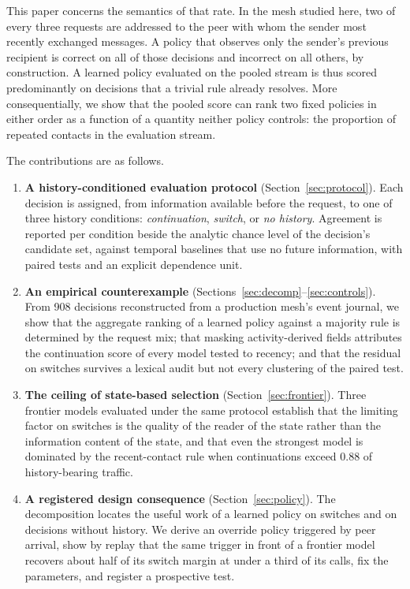 \documentclass[11pt]{article}
\theoremstyle{definition}
\begin{document}
This paper concerns the semantics of that rate. In the mesh studied here, two of every three requests are addressed to the peer with whom the sender most recently exchanged messages. A policy that observes only the sender's previous recipient is correct on all of those decisions and incorrect on all others, by construction. A learned policy evaluated on the pooled stream is thus scored predominantly on decisions that a trivial rule already resolves. More consequentially, we show that the pooled score can rank two fixed policies in either order as a function of a quantity neither policy controls: the proportion of repeated contacts in the evaluation stream.

The contributions are as follows.
\begin{enumerate}
\item \textbf{A history-conditioned evaluation protocol} (Section~\ref{sec:protocol}). Each decision is assigned, from information available before the request, to one of three history conditions: \emph{continuation}, \emph{switch}, or \emph{no history}. Agreement is reported per condition beside the analytic chance level of the decision's candidate set, against temporal baselines that use no future information, with paired tests and an explicit dependence unit.
\item \textbf{An empirical counterexample} (Sections~\ref{sec:decomp}--\ref{sec:controls}). From 908 decisions reconstructed from a production mesh's event journal, we show that the aggregate ranking of a learned policy against a majority rule is determined by the request mix; that masking activity-derived fields attributes the continuation score of every model tested to recency; and that the residual on switches survives a lexical audit but not every clustering of the paired test.
\item \textbf{The ceiling of state-based selection} (Section~\ref{sec:frontier}). Three frontier models evaluated under the same protocol establish that the limiting factor on switches is the quality of the reader of the state rather than the information content of the state, and that even the strongest model is dominated by the recent-contact rule when continuations exceed 0.88 of history-bearing traffic.
\item \textbf{A registered design consequence} (Section~\ref{sec:policy}). The decomposition locates the useful work of a learned policy on switches and on decisions without history. We derive an override policy triggered by peer arrival, show by replay that the same trigger in front of a frontier model recovers about half of its switch margin at under a third of its calls, fix the parameters, and register a prospective test.
\end{enumerate}
\end{document}
